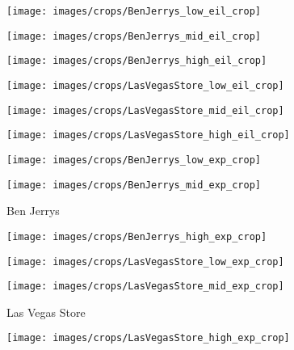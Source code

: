 \documentclass{egpubl}
\begin{document}
\begin{figure*}[htb]
    \begin{subfigure}[t]{0.13\linewidth}
        \centering
        \texttt{[image: images/crops/BenJerrys\_low\_eil\_crop]}
    \end{subfigure}
    \begin{subfigure}[t]{0.13\linewidth}
        \centering
        \texttt{[image: images/crops/BenJerrys\_mid\_eil\_crop]}
    \end{subfigure}
    \begin{subfigure}[t]{0.13\linewidth}
        \centering
        \texttt{[image: images/crops/BenJerrys\_high\_eil\_crop]}
    \end{subfigure}
    \begin{subfigure}[t]{0.13\linewidth}
        \centering
        \texttt{[image: images/crops/LasVegasStore\_low\_eil\_crop]}
    \end{subfigure}
    \begin{subfigure}[t]{0.13\linewidth}
        \centering
        \texttt{[image: images/crops/LasVegasStore\_mid\_eil\_crop]}
    \end{subfigure}
    \begin{subfigure}[t]{0.13\linewidth}
        \centering
        \texttt{[image: images/crops/LasVegasStore\_high\_eil\_crop]}
    \end{subfigure}


    \begin{subfigure}[t]{0.13\linewidth}
        \centering
        \texttt{[image: images/crops/BenJerrys\_low\_exp\_crop]}
    \end{subfigure}
    \begin{subfigure}[t]{0.13\linewidth}
        \centering
        \texttt{[image: images/crops/BenJerrys\_mid\_exp\_crop]}
        \caption{Ben Jerrys}\label{fig:exposures:benjerrys}
    \end{subfigure}
    \begin{subfigure}[t]{0.13\linewidth}
        \centering
        \texttt{[image: images/crops/BenJerrys\_high\_exp\_crop]}
    \end{subfigure}
    \begin{subfigure}[t]{0.13\linewidth}
        \centering
        \texttt{[image: images/crops/LasVegasStore\_low\_exp\_crop]}
    \end{subfigure}
    \begin{subfigure}[t]{0.13\linewidth}
        \centering
        \texttt{[image: images/crops/LasVegasStore\_mid\_exp\_crop]}
        \caption{Las Vegas Store}\label{fig:exposures:lasvegas}
    \end{subfigure}
    \begin{subfigure}[t]{0.13\linewidth}
        \centering
        \texttt{[image: images/crops/LasVegasStore\_high\_exp\_crop]}
    \end{subfigure}


\end{figure*}
\end{document}
